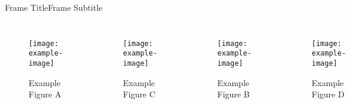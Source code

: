 \begin{frame}{Frame Title}{Frame Subtitle}
	\begin{columns}
		\begin{figure}
			\begin{center}
				\texttt{[image: example-image]}
				\caption{Example Figure A}
			\end{center}
		\end{figure}
		\begin{figure}
			\begin{center}
				\texttt{[image: example-image]}
				\caption{Example Figure C}
			\end{center}
		\end{figure}
		\begin{figure}
			\begin{center}
				\texttt{[image: example-image]}
				\caption{Example Figure B}
			\end{center}
		\end{figure}
		\begin{figure}
			\begin{center}
				\texttt{[image: example-image]}
				\caption{Example Figure D}
			\end{center}
		\end{figure}
	\end{columns}
\end{frame}
